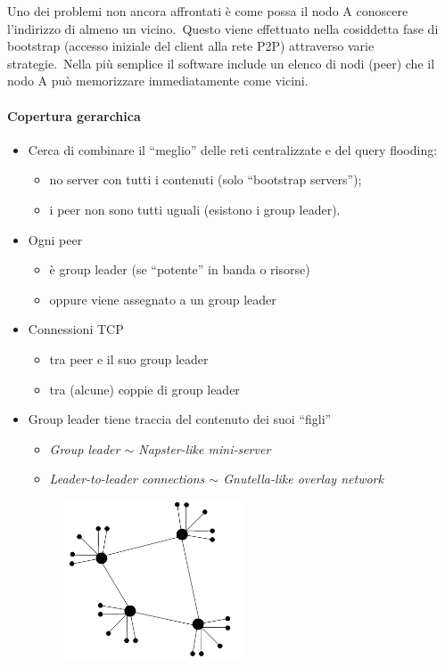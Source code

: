 Uno dei problemi non ancora affrontati è come possa il nodo A conoscere l'indirizzo di almeno un vicino.\
Questo viene effettuato nella cosiddetta fase di bootstrap (accesso iniziale del client alla rete P2P) attraverso varie strategie.\
Nella più semplice il software include un elenco di nodi (peer) che il nodo A può memorizzare immediatamente come vicini.

\paragraph{Copertura gerarchica}

\begin{itemize}
    \item Cerca di combinare il ``meglio'' delle reti centralizzate e del query flooding:
          \begin{itemize}
              \item no server con tutti i contenuti (solo ``bootstrap servers'');
              \item i peer non sono tutti uguali (esistono i group leader).
          \end{itemize}
    \item Ogni peer
          \begin{itemize}
              \item è group leader (se ``potente'' in banda o risorse)
              \item oppure viene assegnato a un group leader
          \end{itemize}
    \item Connessioni TCP
          \begin{itemize}
              \item tra peer e il suo group leader
              \item tra (alcune) coppie di group leader
          \end{itemize}
    \item Group leader tiene traccia del contenuto dei suoi ``figli''
          \begin{itemize}
              \item \emph{Group leader $\sim$ Napster-like mini-server}
              \item \emph{Leader-to-leader connections $\sim$ Gnutella-like overlay network}
          \end{itemize}
          \begin{figure}[H]
              \centering
              \includegraphics[width=0.5\textwidth]{immagini/Copertura_gerarchica.png}

\end{figure}
\end{itemize}
